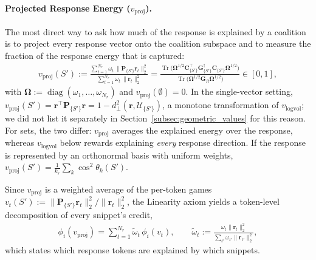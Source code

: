 \documentclass{article}
\begin{document}
\paragraph{Projected Response Energy ($v_{\text{proj}}$).}
The most direct way to ask how much of the response is explained by a coalition is to project every response vector onto the coalition subspace and to measure the fraction of the response energy that is captured:
\begin{align}\label{eq:v_proj}
    v_{\text{proj}}(S') := \frac{\sum_{t=1}^{N_r} \omega_t \, \|\mathbf{P}_{\{S'\}} \mathbf{r}_t\|_2^2}{\sum_{t=1}^{N_r} \omega_t \, \|\mathbf{r}_t\|_2^2} = \frac{\operatorname{Tr}\big(\boldsymbol{\Omega}^{1/2} \mathbf{C}_{\{S'\}}^\top \mathbf{G}_{\{S'\}}^{\dagger} \mathbf{C}_{\{S'\}} \boldsymbol{\Omega}^{1/2}\big)}{\operatorname{Tr}\big(\boldsymbol{\Omega}^{1/2} \mathbf{G}_R \boldsymbol{\Omega}^{1/2}\big)} \in [0, 1],
\end{align}
with $\boldsymbol{\Omega} := \operatorname{diag}(\omega_1, \dots, \omega_{N_r})$ and $v_{\text{proj}}(\emptyset) = 0$. In the single-vector setting, $v_{\text{proj}}(S') = \mathbf{r}^\top \mathbf{P}_{\{S'\}} \mathbf{r} = 1 - d_{\perp}^2(\mathbf{r}, \mathcal{U}_{\{S'\}})$, a monotone transformation of $v_{\text{logvol}}$; we did not list it separately in Section~\ref{subsec:geometric_values} for this reason. For sets, the two differ: $v_{\text{proj}}$ averages the explained energy over the response, whereas $v_{\text{logvol}}$ below rewards explaining \emph{every} response direction. If the response is represented by an orthonormal basis with uniform weights, $v_{\text{proj}}(S') = \frac{1}{k_r} \sum_{k} \cos^2 \theta_k(S')$.

Since $v_{\text{proj}}$ is a weighted average of the per-token games $v_t(S') := \|\mathbf{P}_{\{S'\}} \mathbf{r}_t\|_2^2 / \|\mathbf{r}_t\|_2^2$, the Linearity axiom yields a token-level decomposition of every snippet's credit,
\begin{align}\label{eq:v_proj_token_decomposition}
    \phi_i(v_{\text{proj}}) = \sum_{t=1}^{N_r} \tilde{\omega}_t \, \phi_i(v_t), \qquad \tilde{\omega}_t := \frac{\omega_t \|\mathbf{r}_t\|_2^2}{\sum_{t'} \omega_{t'} \|\mathbf{r}_{t'}\|_2^2},
\end{align}
which states which response tokens are explained by which snippets.
\end{document}
